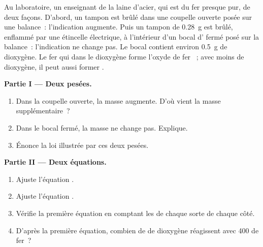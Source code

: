 \begin{problem}
\label{pb:g8:balanced-equations:1}
Au laboratoire, un enseignant  de la laine d'acier, qui est du fer
presque pur, de deux façons. D'abord, un tampon est brûlé dans une
coupelle ouverte posée sur une balance~: l'indication augmente. Puis un
tampon de \qty{0.28}{g} est brûlé, enflammé par une étincelle électrique,
à l'intérieur d'un bocal d' fermé posé sur la balance~: l'indication
ne change pas. Le bocal contient environ \qty{0.5}{g} de dioxygène. Le
fer qui  dans le dioxygène forme l'oxyde de fer ~; avec
moins de dioxygène, il peut aussi former .

\medskip
\noindent\textbf{Partie I --- Deux pesées.}
\begin{enumerate}
  \item Dans la coupelle ouverte, la masse augmente. D'où vient la masse
        supplémentaire~?
  \item Dans le bocal fermé, la masse ne change pas. Explique.
  \item Énonce la loi illustrée par ces deux pesées.
\end{enumerate}

\medskip
\noindent\textbf{Partie II --- Deux équations.}
\begin{enumerate}[resume]
  \item Ajuste l'équation . %
  \item Ajuste l'équation . %
  \item Vérifie la première équation en comptant les  de chaque
        sorte de chaque côté.
  \item D'après la première équation, combien de  de dioxygène
        réagissent avec 400  de fer~?
\end{enumerate}


\end{problem}
